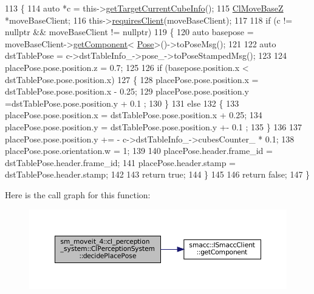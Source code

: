 \begin{DoxyCode}
113             \{
114                 \textcolor{keyword}{auto} *c = this->\hyperlink{classsm__moveit__4_1_1cl__perception__system_1_1ClPerceptionSystem_ac4b944cebb2055a85a33129665df5dcf}{getTargetCurrentCubeInfo}();
115                 \hyperlink{classcl__move__base__z_1_1ClMoveBaseZ}{ClMoveBaseZ} *moveBaseClient;
116                 this->\hyperlink{classsmacc_1_1ISmaccClient_a7a9990a2f3e35d547671188d69fee520}{requiresClient}(moveBaseClient);
117 
118                 \textcolor{keywordflow}{if} (c != \textcolor{keyword}{nullptr} && moveBaseClient != \textcolor{keyword}{nullptr})
119                 \{
120                     \textcolor{keyword}{auto} basepose = moveBaseClient->\hyperlink{classsmacc_1_1ISmaccClient_adef78db601749ca63c19e74a27cb88cc}{getComponent}<
      \hyperlink{classcl__move__base__z_1_1Pose}{Pose}>()->toPoseMsg();
121 
122                     \textcolor{keyword}{auto} dstTablePose = c->dstTableInfo\_->pose\_->toPoseStampedMsg();
123 
124                     placePose.pose.position.z = 0.7;
125 
126                     \textcolor{keywordflow}{if} (basepose.position.x < dstTablePose.pose.position.x)
127                     \{
128                         placePose.pose.position.x = dstTablePose.pose.position.x - 0.25;
129                         placePose.pose.position.y =dstTablePose.pose.position.y +  0.1 ;
130                     \}
131                     \textcolor{keywordflow}{else}
132                     \{
133                         placePose.pose.position.x = dstTablePose.pose.position.x + 0.25;
134                         placePose.pose.position.y = dstTablePose.pose.position.y +- 0.1 ;
135                     \}
136 
137                     placePose.pose.position.y += - c->dstTableInfo\_->cubesCounter\_ * 0.1;
138                     placePose.pose.orientation.w = 1;
139 
140                     placePose.header.frame\_id = dstTablePose.header.frame\_id;
141                     placePose.header.stamp = dstTablePose.header.stamp;
142 
143                     \textcolor{keywordflow}{return} \textcolor{keyword}{true};
144                 \}
145 
146                 \textcolor{keywordflow}{return} \textcolor{keyword}{false};
147             \}
\end{DoxyCode}
Here is the call graph for this function\+:
\nopagebreak
\begin{figure}[H]
\begin{center}
\leavevmode
\includegraphics[width=350pt]{classsm__moveit__4_1_1cl__perception__system_1_1ClPerceptionSystem_af6ff9a225d451bdee312573296ed02a8_cgraph}
\end{center}
\end{figure}
